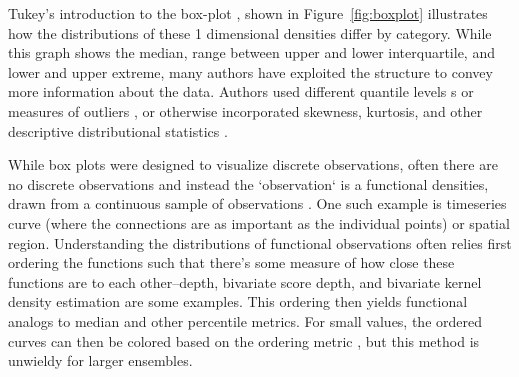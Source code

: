 \documentclass[../main.tex]{subfiles}
\begin{document}
Tukey's introduction to the box-plot \cite{tukey_exploratory_1977}, shown in
Figure~\ref{fig:boxplot} illustrates how the distributions of these 1 dimensional densities differ by category. While this graph shows the median, range between upper and lower interquartile, and lower and upper extreme, many authors have exploited the structure to convey more information about the data. Authors used different quantile levels \cite{hyndman_sample_1996}s or measures of outliers
\cite{frigge_implementations_1989, schwertman_identifying_2007}, or otherwise incorporated skewness, kurtosis, and other descriptive distributional statistics \cite{kim_more_2004, marmolejo-ramos_shifting_2015}.

While box plots were designed to visualize discrete observations, often there
are no discrete observations and instead the `observation` is a functional densities, drawn from a continuous sample of observations \cite{ramsay_functional_2006, muller_functional_2006}.
One such example is timeseries curve (where the connections are as important as the individual points) or
spatial region. Understanding the distributions of functional observations
often relies first ordering the functions such that there's some measure of how close these functions are to each other--depth\cite{febrero_functional_2007},
bivariate score depth\cite{rob_j._hyndman_rainbow_2010}, and
bivariate kernel density estimation\cite{scott_multivariate_1992} are some examples. This
ordering then yields functional analogs to median and other percentile
metrics. For small values, the ordered curves can then be colored based on the
ordering metric \cite{rob_j._hyndman_rainbow_2010}, but this method is unwieldy for larger
ensembles.
\end{document}
